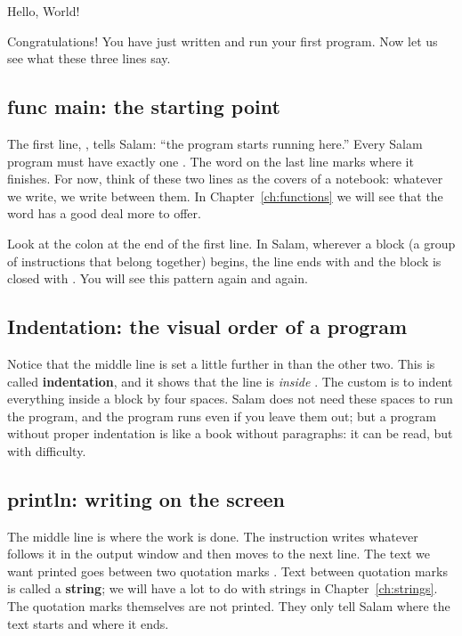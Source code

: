\begin{salamout}
Hello, World!
\end{salamout}

Congratulations! You have just written and run your first program. Now let
us see what these three lines say.

\subsection{func main: the starting point}

The first line, , tells Salam: ``the program starts
running here.'' Every Salam program must have exactly one .
The word  on the last line marks where it finishes. For now, think
of these two lines as the covers of a notebook: whatever we write, we write
between them. In Chapter~\ref{ch:functions} we will see that the word
 has a good deal more to offer.

Look at the colon at the end of the first line. In Salam, wherever a block (a
group of instructions that belong together) begins, the line ends with
\code{:} and the block is closed with . You will see this pattern
again and again.

\subsection{Indentation: the visual order of a program}

Notice that the middle line is set a little further in than the other two.
This is called \textbf{indentation}, and it shows that the line is
\emph{inside} . The custom is to indent everything inside a block
by four spaces. Salam does not need these spaces to run the program, and the
program runs even if you leave them out; but a program without proper
indentation is like a book without paragraphs: it can be read, but with
difficulty.

\subsection{println: writing on the screen}

The middle line is where the work is done. The instruction 
writes whatever follows it in the output window and then moves to the next
line. The text we want printed goes between two quotation marks .
Text between quotation marks is called a \textbf{string}; we will have a lot
to do with strings in Chapter~\ref{ch:strings}. The quotation marks themselves
are not printed. They only tell Salam where the text starts and where it
ends.

